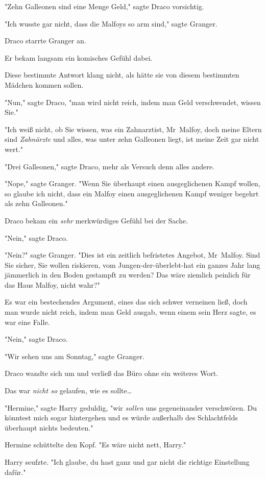 {"Zehn Galleonen sind eine Menge Geld," sagte Draco vorsichtig.

"Ich wusste gar nicht, dass die Malfoys so arm sind," sagte Granger.

Draco starrte Granger an.

Er bekam langsam ein komisches Gefühl dabei.

Diese bestimmte Antwort klang nicht, als hätte sie von diesem bestimmten Mädchen kommen sollen.

"Nun," sagte Draco, "man wird nicht reich, indem man Geld verschwendet, wissen Sie."

"Ich weiß nicht, ob Sie wissen, was ein Zahnarztist, Mr~Malfoy, doch meine Eltern sind \emph{Zahnärzte} und alles, was unter zehn Galleonen liegt, ist meine Zeit gar nicht wert."

"Drei Galleonen," sagte Draco, mehr als Versuch denn alles andere.

"Nope," sagte Granger. "Wenn Sie überhaupt einen ausgeglichenen Kampf wollen, so glaube ich nicht, dass ein Malfoy einen ausgeglichenen Kampf weniger begehrt als zehn Galleonen."

Draco bekam ein \emph{sehr} merkwürdiges Gefühl bei der Sache.

"Nein," sagte Draco.

"Nein?" sagte Granger. "Dies ist ein zeitlich befristetes Angebot, Mr~Malfoy. Sind Sie sicher, Sie wollen riskieren, vom Jungen-der-überlebt-hat ein ganzes Jahr lang jämmerlich in den Boden gestampft zu werden? Das wäre ziemlich peinlich für das Haus Malfoy, nicht wahr?"

Es war ein bestechendes Argument, eines das sich schwer verneinen ließ, doch man wurde nicht reich, indem man Geld ausgab, wenn einem sein Herz sagte, es war eine Falle.

"Nein," sagte Draco.

"Wir sehen uns am Sonntag," sagte Granger.

Draco wandte sich um und verließ das Büro ohne ein weiteres Wort.

Das war \emph{nicht so} gelaufen, wie es sollte…

\later

"Hermine," sagte Harry geduldig, "wir \emph{sollen} uns gegeneinander verschwören. Du könntest mich sogar hintergehen und es würde außerhalb des Schlachtfelds überhaupt nichts bedeuten."

Hermine schüttelte den Kopf. "Es wäre nicht nett, Harry."

Harry seufzte. "Ich glaube, du hast ganz und gar nicht die richtige Einstellung dafür."

}
